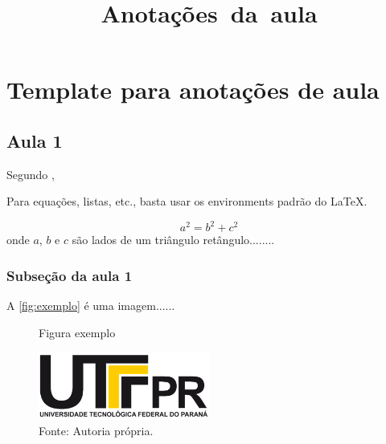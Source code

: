 \documentclass[12pt,a4paper, brazil]{article}
\begin{document}
\title{Anotações\ da\ aula}

\section*{Template para anotações de aula}

\subsection*{Aula 1}


Segundo \textcite{citacao-exemplo}, \lipsum[66] \cite{citacao-exemplo}

\par
Para equações, listas, etc., basta usar os environments padrão do LaTeX.

\begin{equation}
a^2 = b^2 + c^2
\end{equation}
onde $a$, $b$ e $c$ são lados de um triângulo retângulo........

\subsubsection*{Subseção da aula 1}

\lipsum[66]

\lipsum[66]
\par A \autoref{fig:exemplo} é uma imagem......

\begin{figure}[!htb]
    \centering
    \caption{Figura exemplo}
    \includegraphics[width=0.5\textwidth]{logo_utf.png}
    \caption*{Fonte: Autoria própria.} %
    \label{fig:exemplo}
\end{figure}

\lipsum[66]

\printbibliography
\end{document}

